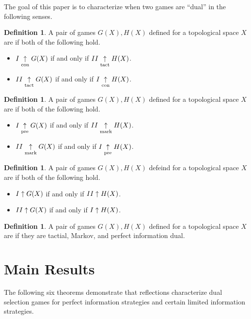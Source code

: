 \documentclass{amsart}
\theoremstyle{plain}
\theoremstyle{definition}
\newtheorem{definition}[theorem]{Definition}
\theoremstyle{remark}
\theoremstyle{plain}
\theoremstyle{definition}
\theoremstyle{remark}
\begin{document}
The goal of this paper is to characterize when two games are ``dual'' in the following
senses.

\begin{definition}
  A pair of games \(G(X),H(X)\) defined for a topological space \(X\)
  are  if both
  of the following hold.
  \begin{itemize}
    \item \(I\underset{\text{con}}{\uparrow} G(X)\) if and only if \(II\underset{\text{tact}}{\uparrow} H(X)\).
    \item \(II\underset{\text{tact}}{\uparrow} G(X)\) if and only if \(I\underset{\text{con}}{\uparrow} H(X)\).
  \end{itemize}
\end{definition}

\begin{definition}
  A pair of games \(G(X),H(X)\) defined for a topological space \(X\)
  are  if both
  of the following hold.
  \begin{itemize}
    \item \(I\underset{\text{pre}}{\uparrow} G(X)\) if and only if \(II\underset{\text{mark}}{\uparrow} H(X)\).
    \item \(II\underset{\text{mark}}{\uparrow} G(X)\) if and only if \(I\underset{\text{pre}}{\uparrow} H(X)\).
  \end{itemize}
\end{definition}

\begin{definition}
  A pair of games \(G(X),H(X)\) defeind for a topological space \(X\)
  are  if both
  of the following hold.
  \begin{itemize}
    \item \(I\uparrow G(X)\) if and only if \(II\uparrow H(X)\).
    \item \(II\uparrow G(X)\) if and only if \(I\uparrow H(X)\).
  \end{itemize}
\end{definition}

\begin{definition}
  A pair of games \(G(X),H(X)\) defined for a topological space \(X\)
  are  if they are tactial, Markov, and perfect information
  dual.
\end{definition}

\section{Main Results}

The following six theorems demonstrate that reflections characterize
dual selection games for perfect information strategies and
certain limited information strategies.
\end{document}
